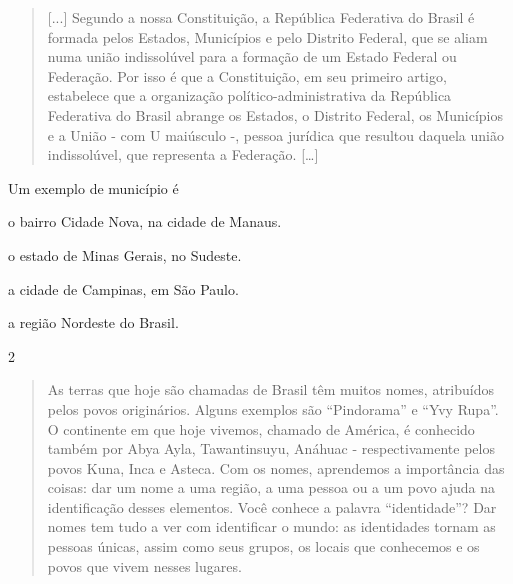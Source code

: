 \begin{quote}
{[}...{]} Segundo a nossa Constituição, a República Federativa do Brasil é
formada pelos Estados, Municípios e pelo Distrito Federal, que se aliam
numa união indissolúvel para a formação de um Estado Federal ou
Federação. Por isso é que a Constituição, em seu primeiro artigo,
estabelece que a organização político-administrativa da República
Federativa do Brasil abrange os Estados, o Distrito Federal, os
Municípios e a União - com U maiúsculo -, pessoa jurídica que resultou
daquela união indissolúvel, que representa a Federação. {[}\ldots{}{]}

\end{quote}

Um exemplo de município é

\begin{escolha}
\item o bairro Cidade Nova, na cidade de Manaus.

\item o estado de Minas Gerais, no Sudeste.

\item a cidade de Campinas, em São Paulo.

\item a região Nordeste do Brasil.
\end{escolha}


\pagebreak
\num{2}

\begin{quote}
As terras que hoje são chamadas de Brasil têm muitos nomes, atribuídos pelos
povos originários. Alguns exemplos são “Pindorama” e “Yvy Rupa”. O continente em que hoje
vivemos, chamado de América, é conhecido também por Abya Ayla, Tawantinsuyu, Anáhuac - respectivamente pelos
povos Kuna, Inca e Asteca. Com os nomes, aprendemos a importância das
coisas: dar um nome a uma região, a uma pessoa ou a um povo ajuda na identificação desses elementos. Você conhece a palavra “identidade”?
Dar nomes tem tudo a ver com identificar o mundo: as
identidades tornam as pessoas únicas, assim como seus grupos, os locais que conhecemos e os povos que vivem nesses lugares.

\end{quote}

